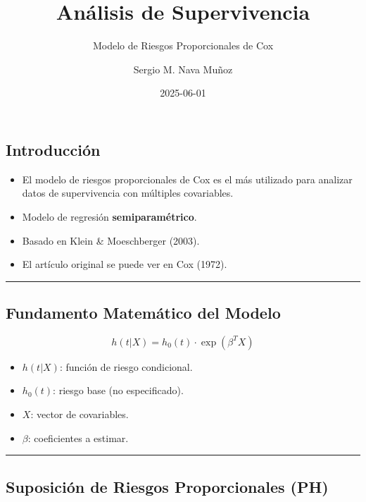 \documentclass[
]{article}
\title{Análisis de Supervivencia}
\subtitle{Modelo de Riesgos Proporcionales de Cox}
\author{Sergio M. Nava Muñoz}
\date{2025-06-01}
\providecommand{\tightlist}{%
  \setlength{\itemsep}{0pt}\setlength{\parskip}{0pt}}\usepackage{longtable,booktabs,array}
\renewcommand*\contentsname{Table of contents}
\newcommand\contentsname{Table of contents}
\begin{document}
\maketitle

\renewcommand*\contentsname{Table of contents}
{
\hypersetup{linkcolor=}
\setcounter{tocdepth}{2}
\tableofcontents
}

\subsection{Introducción}\label{introducciuxf3n}

\begin{itemize}
\tightlist
\item
  El modelo de riesgos proporcionales de Cox es el más utilizado para
  analizar datos de supervivencia con múltiples covariables.
\item
  Modelo de regresión \textbf{semiparamétrico}.
\item
  Basado en Klein \& Moeschberger (2003).
\item
  El artículo original se puede ver en Cox (1972).
\end{itemize}

\begin{center}\rule{0.5\linewidth}{0.5pt}\end{center}

\subsection{Fundamento Matemático del
Modelo}\label{fundamento-matemuxe1tico-del-modelo}

\[
h(t|X) = h_0(t) \cdot \exp(\beta^T X)
\]

\begin{itemize}
\tightlist
\item
  \(h(t|X)\): función de riesgo condicional.
\item
  \(h_0(t)\): riesgo base (no especificado).
\item
  \(X\): vector de covariables.
\item
  \(\beta\): coeficientes a estimar.
\end{itemize}

\begin{center}\rule{0.5\linewidth}{0.5pt}\end{center}

\subsection{Suposición de Riesgos Proporcionales
(PH)}\label{suposiciuxf3n-de-riesgos-proporcionales-ph}
\end{document}
